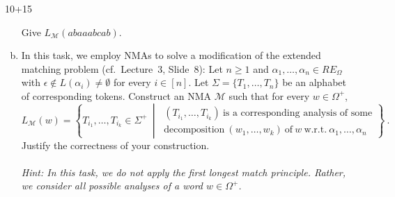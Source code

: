 \begin{exercise}{10+15}
\begin{enumerate}[a)]
\begin{center}
    \end{center}
    Give $L_{\mathcal{M}}(abaaabcab)$.
    \item  In this task, we employ NMAs to solve a modification of the extended matching problem (cf.\ Lecture~3, Slide~8): Let $n \geq 1$ and $\alpha_1,\ldots,\alpha_n \in RE_\Omega$ with $\epsilon \not\in L(\alpha_i) \ne \emptyset$ for every $i \in [n]$. Let $\Sigma = \{T_1,\ldots,T_n\}$ be an alphabet of corresponding tokens. Construct an NMA $\mathcal{M}$ such that for every $w \in \Omega^+$,
    \begin{equation*}
         L_{\mathcal{M}}(w) = \left\{  T_{i_1},\ldots,T_{i_k} \in \Sigma^+ ~\middle|~ \begin{aligned}(T_{i_1},\ldots,T_{i_k})~\text{is a corresponding analysis of some} \\
         \text{decomposition}~(w_1,\ldots,w_k)~\text{of}~w~\text{w.r.t.}~\alpha_1,\ldots,\alpha_n \end{aligned} \right\}~.
    \end{equation*}
    Justify the correctness of your construction. \\ \\
    \noindent
    \emph{Hint: In this task, we do not apply the first longest match principle. Rather, we consider \emph{all} possible analyses of a word $w \in \Omega^+$.}
\end{enumerate}
\end{exercise}

